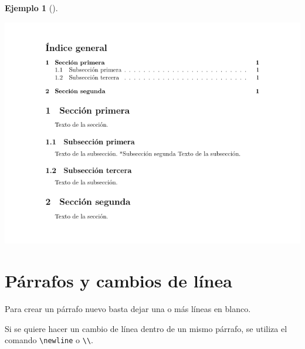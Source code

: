 \documentclass[
  a4paper,
]{scrreport}
\theoremstyle{definition}
\newtheorem{example}{Ejemplo}[chapter]
\theoremstyle{remark}
\begin{document}
\begin{example}[]
\begin{tcolorbox}
\includegraphics{img/secciones/secciones.png}

\end{tcolorbox}

\end{example}

\section{Párrafos y cambios de
línea}\label{puxe1rrafos-y-cambios-de-luxednea}

Para crear un párrafo nuevo basta dejar una o más líneas en blanco.

Si se quiere hacer un cambio de línea dentro de un mismo párrafo, se
utiliza el comando \texttt{\textbackslash{}newline} o
\texttt{\textbackslash{}\textbackslash{}}.
\end{document}
